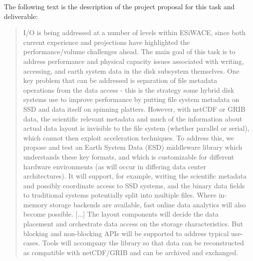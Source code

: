 \documentclass{../../template/esiwace-report}
\begin{document}
The following text is the description of the project proposal for this task and deliverable:

\begin{quote}
\itshape

I/O is being addressed at a number of levels within ESiWACE, since both current experience
and projections have highlighted the performance/volume challenges ahead.
The main goal of this task is to address performance and physical capacity issues associated with
writing, accessing, and earth system data in the disk subsystem themselves.
One key problem that can be addressed is separation of file metadata operations from the data access -
this is the strategy some hybrid disk systems use to improve performance by putting file system metadata on SSD and data itself on spinning platters.
However, with netCDF or GRIB data, the scientific relevant metadata and much of the information about actual data layout is invisible to the file system (whether parallel or serial), which cannot then exploit acceleration techniques.
To address this, we propose and test an Earth System Data (ESD) middleware library which understands these key formats, and which is customizable for different hardware environments (as will occur in differing data center architectures).
It will support, for example, writing the scientific metadata and possibly coordinate access to SSD systems, and the binary data fields to traditional systems potentially split into multiple files.
Where in-memory storage backends are available, fast online data analytics will also become possible.
[...]
The layout components will decide the data placement and orchestrate data access on the storage characteristics.
But blocking and non-blocking APIs will be supported to address typical use-cases.
Tools will accompany the library so that data can be reconstructed as compatible with netCDF/GRIB and can be archived and exchanged.
\end{quote}




\end{document}
